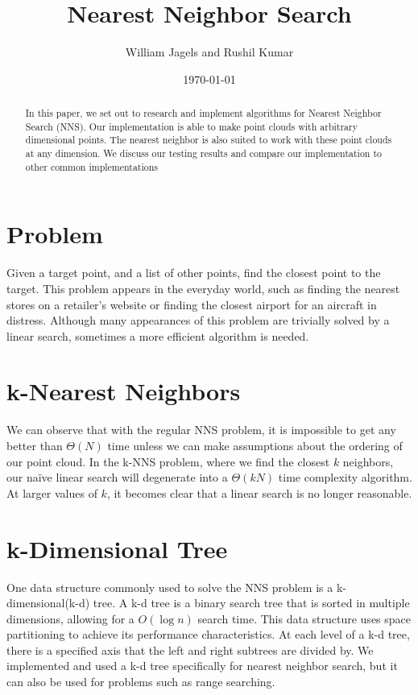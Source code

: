 \documentclass[a4paper,12pt,twocolumn]{article}
\title{Nearest Neighbor Search}
\author{William Jagels and Rushil Kumar}
\date{\today}
\begin{document}
\maketitle

\begin{abstract}
  In this paper, we set out to research and implement algorithms for Nearest Neighbor Search (NNS).
  Our implementation is able to make point clouds with arbitrary dimensional points.
  The nearest neighbor is also suited to work with these point clouds at any dimension.
  We discuss our testing results and compare our implementation to other common implementations
\end{abstract}

\section{Problem}
Given a target point, and a list of other points, find the closest point to the target.
This problem appears in the everyday world, such as finding the nearest stores on a
retailer's website or finding the closest airport for an aircraft in distress.
Although many appearances of this problem are trivially solved by a linear search,
sometimes a more efficient algorithm is needed.

\section{k-Nearest Neighbors}
We can observe that with the regular NNS problem, it is impossible to get any better than
$\Theta(N)$ time unless we can make assumptions about the ordering of our point cloud.
In the k-NNS problem, where we find the closest $k$ neighbors, our naïve linear search
will degenerate into a $\Theta(kN)$ time complexity algorithm.
At larger values of $k$, it becomes clear that a linear search is no longer reasonable.

\section{k-Dimensional Tree}
One data structure commonly used to solve the NNS problem is a k-dimensional(k-d) tree.
A k-d tree is a binary search tree that is sorted in multiple dimensions, allowing
for a $O(\log n)$ search time.
This data structure uses space partitioning to achieve its performance characteristics.
At each level of a k-d tree, there is a specified axis that the left and right subtrees
are divided by.
We implemented and used a k-d tree specifically for nearest neighbor search, but it can
also be used for problems such as range searching.
\end{document}
